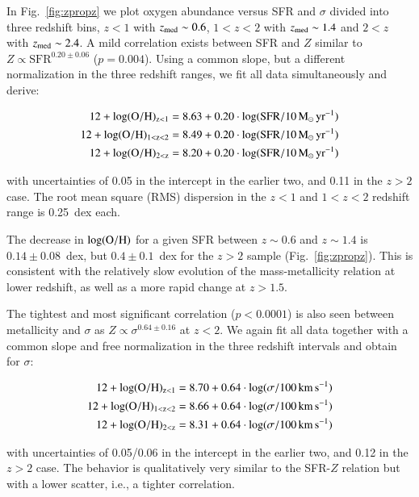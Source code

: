 \documentclass[traditabstract, longauth]{aa}
\newcommand{\oh}{12+\log(\rm{O/H})}
\begin{document}
In Fig.~\ref{fig:zpropz} we plot oxygen abundance versus SFR and $\sigma$ divided into three redshift bins, $z<1$ with $z_{\rm{med}}\sim0.6$, $1<z<2$ with $z_{\rm{med}}\sim1.4$ and $2<z$ with $z_{\rm{med}}\sim2.4$. A mild correlation exists between SFR and $Z$ similar to $Z\propto\mathrm{SFR}^{0.20\pm0.06}$ ($p=0.004$). Using a common slope, but a different normalization in the three redshift ranges, we fit all data simultaneously and derive:

\begin{equation}
\label{eq:ohsfr}
\begin{split}
\oh_{z<1} = 8.63 + 0.20\cdot \log(\rm{SFR/10\,M_\odot\,yr^{-1}}) \\
\oh_{1<z<2} = 8.49 + 0.20\cdot \log(\rm{SFR/10\,M_\odot\,yr^{-1}})  \\
\oh_{2<z} = 8.20 + 0.20\cdot \log(\rm{SFR/10\,M_\odot\,yr^{-1}})  \\
\end{split}
\end{equation}

 {with uncertainties of 0.05 in the intercept in the earlier two, and 0.11 in the $z>2$ case. The root mean square (RMS) dispersion in the $z<1$ and $1<z<2$ redshift range is 0.25~dex each.}

The decrease in $\log(\rm{O/H})$ for a given SFR between $z\sim0.6$ and $z\sim1.4$ is $0.14\pm0.08$~dex, but $0.4\pm0.1$~dex for the $z > 2$ sample (Fig.~\ref{fig:zpropz}). This is consistent with the relatively slow evolution of the mass-metallicity relation at lower redshift, as well as a more rapid change at $z > 1.5$. 

The tightest and most significant correlation ($p<0.0001$) is also seen between metallicity and $\sigma$ as $Z\propto\sigma^{0.64\pm0.16}$ at $z<2$. We again fit all data together with a common slope and free normalization in the three redshift intervals and obtain for $\sigma$:

\begin{equation}
\label{eq:ohsigma}
\begin{split}
\oh_{z<1} = 8.70 + 0.64\cdot \log(\sigma/\rm{100\,km\,s^{-1}}) \\
\oh_{1<z<2} = 8.66 + 0.64\cdot \log(\sigma/\rm{100\,km\,s^{-1}}) \\
\oh_{2<z} = 8.31 + 0.64\cdot \log(\sigma/\rm{100\,km\,s^{-1}})
\end{split}
\end{equation}

with uncertainties of 0.05/0.06 in the intercept in the earlier two, and 0.12 in the $z>2$ case. The behavior is qualitatively very similar to the SFR-$Z$ relation but with a lower scatter, i.e., a tighter correlation. 
\end{document}
